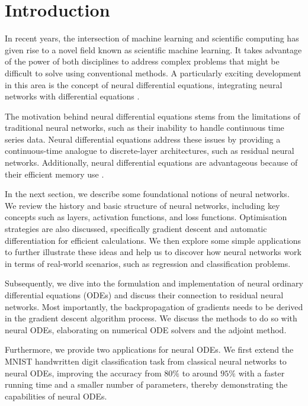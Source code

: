 \documentclass[a4paper,11pt,titlepage]{article}
\theoremstyle{definition}
\theoremstyle{plain}
\theoremstyle{remark}
\begin{document}
\section{Introduction}

In recent years, the intersection of machine learning and scientific computing has given rise to a novel field known as scientific machine learning. It takes advantage of the power of both disciplines to address complex problems that might be difficult to solve using conventional methods. A particularly exciting development in this area is the concept of neural differential equations, integrating neural networks with differential equations \cite{chen2018neural}.

The motivation behind neural differential equations stems from the limitations of traditional neural networks, such as their inability to handle continuous time series data. Neural differential equations address these issues by providing a continuous-time analogue to discrete-layer architectures, such as residual neural networks. Additionally, neural differential equations are advantageous because of their efficient memory use \cite{haoxuan2023}.

In the next section, we describe some foundational notions of neural networks. We review the history and basic structure of neural networks, including key concepts such as layers, activation functions, and loss functions. Optimisation strategies are also discussed, specifically gradient descent and automatic differentiation for efficient calculations. We then explore some simple applications to further illustrate these ideas and help us to discover how neural networks work in terms of real-world scenarios, such as regression and classification problems.

Subsequently, we dive into the formulation and implementation of neural ordinary differential equations (ODEs) and discuss their connection to residual neural networks. Most importantly, the backpropagation of gradients needs to be derived in the gradient descent algorithm process. We discuss the methods to do so with neural ODEs, elaborating on numerical ODE solvers and the adjoint method.

Furthermore, we provide two applications for neural ODEs. We first extend the MNIST handwritten digit classification task from classical neural networks to neural ODEs, improving the accuracy from $80\%$ to around $95\%$ with a faster running time and a smaller number of parameters, thereby demonstrating the capabilities of neural ODEs.
\end{document}
